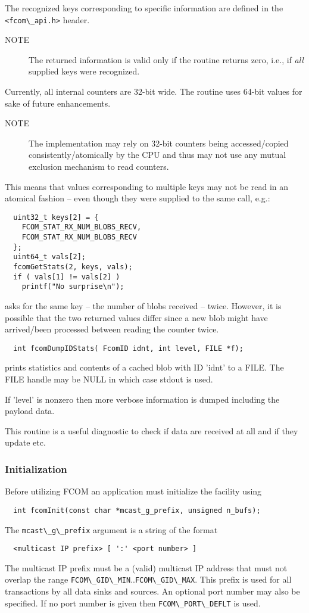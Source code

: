 \documentclass[11pt]{article}
\newcommand{\fcom}{FCOM}
\newcommand{\blob}{blob}
\newcommand{\cstl}[1]{{\lstinline+#1+}}
\newcommand{\note}[1]{
	\begin{description}
		\item[NOTE] #1
	\end{description}
}
\begin{document}
      The recognized keys corresponding to specific information
      are defined in the \cstl{<fcom\_api.h>} header.
 
      \note{The returned information is valid only if the
      routine returns zero, i.e., if {\em all} supplied keys
      were recognized.}

      Currently, all internal counters are 32-bit wide. The
      routine uses 64-bit values for sake of future enhancements.

      \note{The implementation may rely on 32-bit counters
      being accessed/copied consistently/atomically by the CPU and thus
      may not use any mutual exclusion mechanism to read counters.}

      This means that values corresponding to multiple keys
      may not be read in an atomical fashion -- even though
      they were supplied to the same call, e.g.:
      \begin{verbatim}
  uint32_t keys[2] = {
    FCOM_STAT_RX_NUM_BLOBS_RECV,
    FCOM_STAT_RX_NUM_BLOBS_RECV
  };
  uint64_t vals[2];
  fcomGetStats(2, keys, vals);
  if ( vals[1] != vals[2] )
    printf("No surprise\n");
      \end{verbatim}
      asks for the same key -- the number of \blob{}s received --
      twice. However, it is possible that the two returned values
      differ since a new \blob{} might have arrived/been processed
      between reading the counter twice.

      \begin{verbatim}
  int fcomDumpIDStats( FcomID idnt, int level, FILE *f);
      \end{verbatim}

	  prints statistics and contents of a cached \blob{} with
      ID 'idnt' to a FILE. The FILE handle may be NULL in
      which case stdout is used. 

	  If 'level' is nonzero then more verbose information
      is dumped including the payload data.

	  This routine is a useful diagnostic to check if data are received
      at all and if they update etc.

    \subsubsection{Initialization}
      Before utilizing \fcom{} an application must initialize
      the facility using
      \begin{verbatim}
  int fcomInit(const char *mcast_g_prefix, unsigned n_bufs);
      \end{verbatim}
      The \cstl{mcast\_g\_prefix} argument is a string of
      the format
      \begin{verbatim}
  <multicast IP prefix> [ ':' <port number> ]
      \end{verbatim}
      The multicast IP prefix must be a (valid) multicast
      IP address that must not overlap the range
      \cstl{FCOM\_GID\_MIN}..\cstl{FCOM\_GID\_MAX}. This
      prefix is used for all transactions by all data
      sinks and sources. An optional port number may
      also be specified. If no port number is given then
      \cstl{FCOM\_PORT\_DEFLT} is used.
\end{document}
